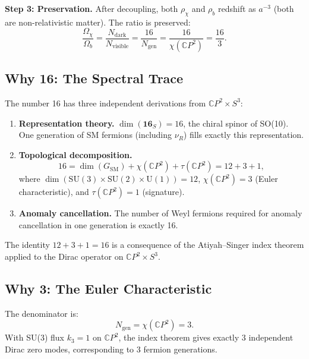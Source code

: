 \documentclass[11pt]{article}
\theoremstyle{definition}
\theoremstyle{remark}
\newcommand{\CP}{\mathbb{C}P}
\begin{document}
\textbf{Step 3: Preservation.}
After decoupling, both $\rho_\chi$ and $\rho_b$ redshift as $a^{-3}$ (both
are non-relativistic matter). The ratio is preserved:
\begin{equation}
  \boxed{\frac{\Omega_\chi}{\Omega_b}
  = \frac{N_\mathrm{dark}}{N_\mathrm{visible}}
  = \frac{16}{N_\mathrm{gen}}
  = \frac{16}{\chi(\CP^2)} = \frac{16}{3}.}
\end{equation}

\subsection{Why 16: The Spectral Trace}

The number 16 has three independent derivations from $\CP^2 \times S^3$:

\begin{enumerate}
  \item \textbf{Representation theory.}
    $\dim(\mathbf{16}_S) = 16$, the chiral spinor of SO(10). One generation
    of SM fermions (including $\nu_R$) fills exactly this representation.

  \item \textbf{Topological decomposition.}
    \begin{equation}
      16 = \dim(G_\mathrm{SM}) + \chi(\CP^2) + \tau(\CP^2) = 12 + 3 + 1,
    \end{equation}
    where $\dim(\mathrm{SU}(3) \times \mathrm{SU}(2) \times \mathrm{U}(1)) = 12$,
    $\chi(\CP^2) = 3$ (Euler characteristic), and $\tau(\CP^2) = 1$ (signature).

  \item \textbf{Anomaly cancellation.}
    The number of Weyl fermions required for anomaly cancellation in one
    generation is exactly 16.
\end{enumerate}

The identity $12 + 3 + 1 = 16$ is a consequence of the Atiyah--Singer
index theorem applied to the Dirac operator on $\CP^2 \times S^3$.

\subsection{Why 3: The Euler Characteristic}

The denominator is:
\begin{equation}
  N_\mathrm{gen} = \chi(\CP^2) = 3.
\end{equation}
With SU(3) flux $k_3 = 1$ on $\CP^2$, the index theorem gives exactly 3
independent Dirac zero modes, corresponding to 3 fermion generations.
\end{document}
